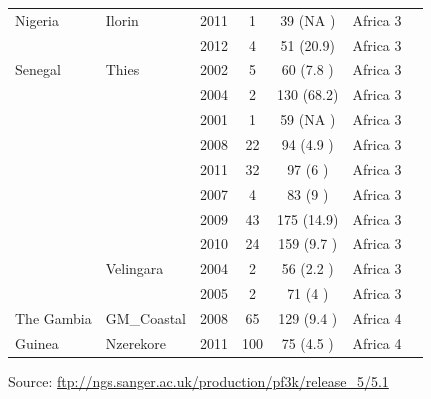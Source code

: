 \documentclass[9pt,lineno]{elife}
\begin{document}
\begin{table}[bt]
\begin{tabular}{l l c c c c c}
 \hline
Nigeria         &Ilorin         &2011 &1    &39   (NA  )&Africa 3\\
                &               &2012 &4    &51   (20.9)&Africa 3\\
 \hline
Senegal         &Thies          &2002 &5    &60   (7.8 )&Africa 3\\
                &               &2004 &2    &130  (68.2)&Africa 3\\
                &               &2001 &1    &59   (NA  )&Africa 3\\
                &               &2008 &22   &94   (4.9 )&Africa 3\\
                &               &2011 &32   &97   (6   )&Africa 3\\
                &               &2007 &4    &83   (9   )&Africa 3\\
                &               &2009 &43   &175  (14.9)&Africa 3\\
                &               &2010 &24   &159  (9.7 )&Africa 3\\
                &Velingara      &2004 &2    &56   (2.2 )&Africa 3\\
                &               &2005 &2    &71   (4   )&Africa 3\\
 \hline
The Gambia      &GM\_Coastal    &2008 &65   &129  (9.4 )&Africa 4\\
 \hline
Guinea          &Nzerekore      &2011 &100  &75   (4.5 )&Africa 4\\
\bottomrule
\end{tabular}

\medskip
Source: \url{ftp://ngs.sanger.ac.uk/production/pf3k/release_5/5.1}

\end{table}
\end{document}
